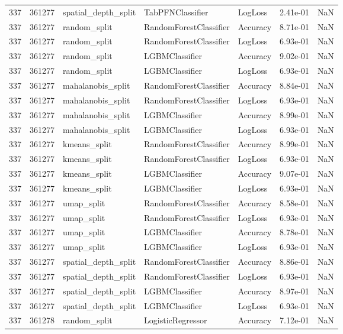 \begin{tabular}{rrlllrr}
337 & 361277 & spatial\_depth\_split & TabPFNClassifier & LogLoss & 2.41e-01 & NaN \\
337 & 361277 & random\_split & RandomForestClassifier & Accuracy & 8.71e-01 & NaN \\
337 & 361277 & random\_split & RandomForestClassifier & LogLoss & 6.93e-01 & NaN \\
337 & 361277 & random\_split & LGBMClassifier & Accuracy & 9.02e-01 & NaN \\
337 & 361277 & random\_split & LGBMClassifier & LogLoss & 6.93e-01 & NaN \\
337 & 361277 & mahalanobis\_split & RandomForestClassifier & Accuracy & 8.84e-01 & NaN \\
337 & 361277 & mahalanobis\_split & RandomForestClassifier & LogLoss & 6.93e-01 & NaN \\
337 & 361277 & mahalanobis\_split & LGBMClassifier & Accuracy & 8.99e-01 & NaN \\
337 & 361277 & mahalanobis\_split & LGBMClassifier & LogLoss & 6.93e-01 & NaN \\
337 & 361277 & kmeans\_split & RandomForestClassifier & Accuracy & 8.99e-01 & NaN \\
337 & 361277 & kmeans\_split & RandomForestClassifier & LogLoss & 6.93e-01 & NaN \\
337 & 361277 & kmeans\_split & LGBMClassifier & Accuracy & 9.07e-01 & NaN \\
337 & 361277 & kmeans\_split & LGBMClassifier & LogLoss & 6.93e-01 & NaN \\
337 & 361277 & umap\_split & RandomForestClassifier & Accuracy & 8.58e-01 & NaN \\
337 & 361277 & umap\_split & RandomForestClassifier & LogLoss & 6.93e-01 & NaN \\
337 & 361277 & umap\_split & LGBMClassifier & Accuracy & 8.78e-01 & NaN \\
337 & 361277 & umap\_split & LGBMClassifier & LogLoss & 6.93e-01 & NaN \\
337 & 361277 & spatial\_depth\_split & RandomForestClassifier & Accuracy & 8.86e-01 & NaN \\
337 & 361277 & spatial\_depth\_split & RandomForestClassifier & LogLoss & 6.93e-01 & NaN \\
337 & 361277 & spatial\_depth\_split & LGBMClassifier & Accuracy & 8.97e-01 & NaN \\
337 & 361277 & spatial\_depth\_split & LGBMClassifier & LogLoss & 6.93e-01 & NaN \\
337 & 361278 & random\_split & LogisticRegressor & Accuracy & 7.12e-01 & NaN \\

\end{tabular}

